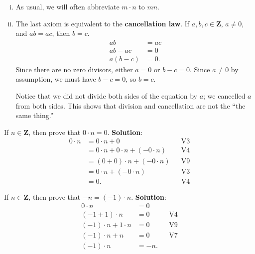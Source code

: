 \begin{Remark}{}{}
    \begin{enumerate}[(i)]
        \item As usual, we will often abbreviate $ m\cdot n $ to $ mn $.
        \item The last axiom is equivalent to the \textbf{cancellation law}.
              If $ a,b,c\in\mathbf{Z} $, $ a\ne 0 $, and $ab=ac$, then
              $ b=c $.
              \begin{align*}
                  ab     & =ac \\
                  ab-ac  & =0  \\
                  a(b-c) & =0.
              \end{align*}
              Since there are no zero divisors, either $a = 0$ or $b - c = 0$. Since $ a\ne 0 $ by assumption, we must have
              $b - c = 0$, so $b = c$.

              Notice that we did not divide both sides of the equation by $ a $; we cancelled $a$ from both sides. This shows
              that division and cancellation are not the ``the same thing.''
    \end{enumerate}
\end{Remark}
\begin{Exercise}{}{}
    If $ n\in\mathbf{Z} $, then prove that $ 0\cdot n=0 $.
    \tcblower{}
    \textbf{Solution}:
    \begin{align*}
        0\cdot n
         & =0\cdot n+0                    &  & \text{V3} \\
         & =0\cdot n+0\cdot n+(-0\cdot n) &  & \text{V4} \\
         & =(0+0)\cdot n+(-0\cdot n)      &  & \text{V9} \\
         & =0\cdot n+(-0\cdot n)          &  & \text{V3} \\
         & =0.                            &  & \text{V4}
    \end{align*}
\end{Exercise}
\begin{Exercise}{}{}
    If $ n\in\mathbf{Z} $, then prove that $ -n=(-1)\cdot n $.
    \tcblower{}
    \textbf{Solution}:
    \begin{align*}
        0\cdot n             & =0                  \\
        (-1+1)\cdot n        & =0   &  & \text{V4} \\
        (-1)\cdot n+1\cdot n & =0   &  & \text{V9} \\
        (-1)\cdot n+n        & =0   &  & \text{V7} \\
        (-1)\cdot n          & =-n.
    \end{align*}
\end{Exercise}
